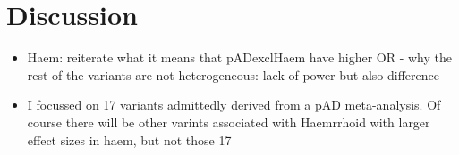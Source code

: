 \section{Discussion}
\begin{itemize}
  \item Haem: reiterate what it means that pADexclHaem have higher OR - why the rest of the variants are not heterogeneous: lack of power but also difference - 
  \item I focussed on 17 variants admittedly derived from a pAD meta-analysis. Of course there will be other varints associated with Haemrrhoid with larger effect sizes in haem, but not those 17
\end{itemize}